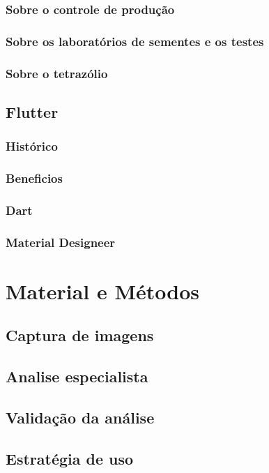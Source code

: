 \subsection{Sobre o controle de produção}
\subsection{Sobre os laboratórios de sementes e os testes}
\subsection{Sobre o tetrazólio}

\section{Flutter}
\subsection{Histórico}
\subsection{Beneficios}
\subsection{Dart}
\subsection{Material Designeer}


\chapter{Material e Métodos}
\section{Captura de imagens}
\section{Analise especialista}
\section{Validação da análise}
\section{Estratégia de uso}
